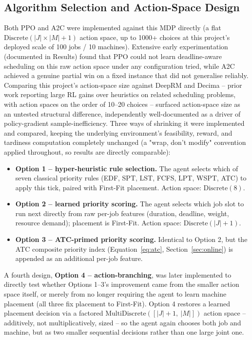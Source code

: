 \documentclass[12pt]{article}
\begin{document}
\subsection{Algorithm Selection and Action-Space Design}
Both PPO and A2C were implemented against this MDP directly (a flat $\text{Discrete}(|J|\times|M| + 1)$ action space, up to 1000+ choices at this project's deployed scale of 100 jobs / 10 machines). Extensive early experimentation (documented in Results) found that PPO could not learn deadline-aware scheduling on this raw action space under any configuration tried, while A2C achieved a genuine partial win on a fixed instance that did not generalise reliably. Comparing this project's action-space size against DeepRM \cite{mao2016deeprm} and Decima \cite{mao2019decima} -- prior work reporting large RL gains over heuristics on related scheduling problems, with action spaces on the order of 10--20 choices -- surfaced action-space size as an untested structural difference, independently well-documented as a driver of policy-gradient sample-inefficiency. Three ways of shrinking it were implemented and compared, keeping the underlying environment's feasibility, reward, and tardiness computation completely unchanged (a "wrap, don't modify" convention applied throughout, so results are directly comparable):
\begin{itemize}
    \item \textbf{Option 1 -- hyper-heuristic rule selection.} The agent selects which of seven classical priority rules (EDF, SPT, LST, FCFS, LPT, WSPT, ATC) to apply this tick, paired with First-Fit placement. Action space: $\text{Discrete}(8)$.
    \item \textbf{Option 2 -- learned priority scoring.} The agent selects which job slot to run next directly from raw per-job features (duration, deadline, weight, resource demand); placement is First-Fit. Action space: $\text{Discrete}(|J|+1)$.
    \item \textbf{Option 3 -- ATC-primed priority scoring.} Identical to Option 2, but the ATC composite priority index (Equation~\ref{eq:atc}, Section~\ref{sec:online}) is appended as an additional per-job feature.
\end{itemize}
A fourth design, \textbf{Option 4 -- action-branching}, was later implemented to directly test whether Options 1--3's improvement came from the smaller action space itself, or merely from no longer requiring the agent to learn machine placement (all three fix placement to First-Fit). Option 4 restores a learned placement decision via a factored $\text{MultiDiscrete}([|J|+1,\ |M|])$ action space \cite{tavakoli2018actionbranching} -- additively, not multiplicatively, sized -- so the agent again chooses both job and machine, but as two smaller sequential decisions rather than one large joint one.
\end{document}
